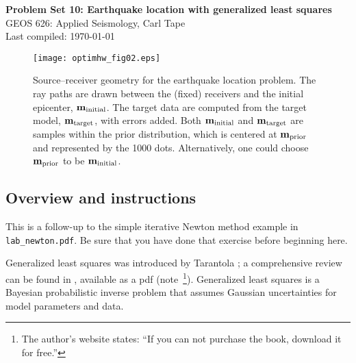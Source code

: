 \documentclass[11pt,titlepage,fleqn]{article}
\begin{document}

\begin{spacing}{1.2}
\centering
{\large \bf Problem Set 10: Earthquake location with generalized least squares} \\
GEOS 626: Applied Seismology, Carl Tape \\
Last compiled: \today
\end{spacing}


\vspace{1cm}
\begin{figure}[h]
\centering
\texttt{[image: optimhw\_fig02.eps]}
\caption[Source-receiver geometry]
{{
Source--receiver geometry for the earthquake location problem. The ray paths are drawn between the (fixed) receivers and the initial epicenter, $\mbox{${\bf m}$}_{\rm initial}$. The target data are computed from the target model, $\mbox{${\bf m}$}_{\rm target}$, with errors added. Both $\mbox{${\bf m}$}_{\rm initial}$ and $\mbox{${\bf m}$}_{\rm target}$ are samples within the prior distribution, which is centered at $\mbox{${\bf m}$}_{\rm prior}$ and represented by the 1000 dots. Alternatively, one could choose $\mbox{${\bf m}$}_{\rm prior}$ to be $\mbox{${\bf m}$}_{\rm initial}$.
\label{fig:srcrec}
}}
\end{figure}


\pagebreak
\subsection*{Overview and instructions}

This is a follow-up to the simple iterative Newton method example in \verb+lab_newton.pdf+. Be sure that you have done that exercise before beginning here.

Generalized least squares was introduced by Tarantola \citep{TarantolaValette1982quest,TarantolaValette1982nonlinear}; a comprehensive review can be found in \citet{Tarantola2005}, available as a pdf (note~\footnote{The author's website states: ``If you can not purchase the book, download it for free.''}). Generalized least squares is a Bayesian probabilistic inverse problem that assumes Gaussian uncertainties for model parameters and data.
\end{document}
